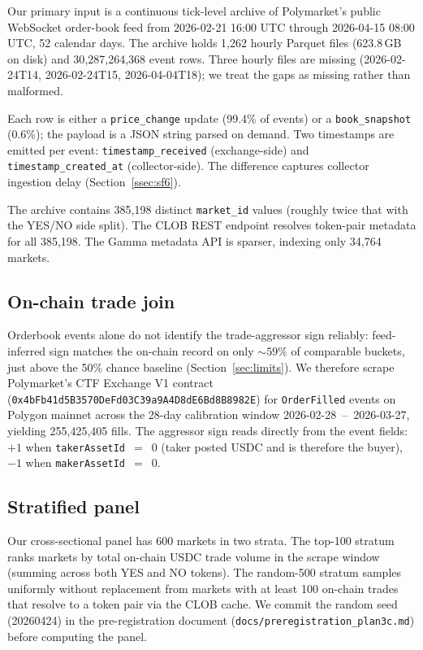 \documentclass[11pt,a4paper,twocolumn]{article}
\begin{document}
Our primary input is a continuous tick-level archive of Polymarket's
public WebSocket order-book feed from 2026-02-21 16:00 UTC through
2026-04-15 08:00 UTC, 52 calendar days. The archive holds 1{,}262
hourly Parquet files (623.8\,GB on disk) and 30{,}287{,}264{,}368
event rows. Three hourly files are missing
(2026-02-24T14, 2026-02-24T15, 2026-04-04T18); we treat the gaps as
missing rather than malformed.

Each row is either a \texttt{price\_change} update (99.4\% of events)
or a \texttt{book\_snapshot} (0.6\%); the payload is a JSON string
parsed on demand. Two timestamps are emitted per event:
\texttt{timestamp\_received} (exchange-side) and
\texttt{timestamp\_created\_at} (collector-side). The difference
captures collector ingestion delay (Section~\ref{ssec:sf6}).

The archive contains 385{,}198 distinct \texttt{market\_id} values
(roughly twice that with the YES/NO side split). The CLOB REST
endpoint resolves token-pair metadata for all 385{,}198. The Gamma
metadata API is sparser, indexing only 34{,}764 markets.

\subsection{On-chain trade join}
\label{ssec:onchain-join}

Orderbook events alone do not identify the trade-aggressor sign
reliably: feed-inferred sign matches the on-chain record on only
$\sim 59\%$ of comparable buckets, just above the 50\% chance
baseline (Section~\ref{sec:limits}). We therefore scrape Polymarket's
CTF Exchange V1 contract
(\texttt{0x4bFb41d5\allowbreak B3570DeFd03\allowbreak C39a9A4D8dE6Bd8\allowbreak B8982E})
for \texttt{OrderFilled} events on Polygon mainnet across the 28-day
calibration window 2026-02-28~--~2026-03-27, yielding 255{,}425{,}405
fills. The aggressor sign reads directly from the event fields: $+1$
when \texttt{takerAssetId}~$=$~0 (taker posted USDC and is therefore
the buyer), $-1$ when \texttt{makerAssetId}~$=$~0.

\subsection{Stratified panel}
\label{ssec:panel}

Our cross-sectional panel has 600 markets in two strata. The top-100
stratum ranks markets by total on-chain USDC trade volume in the
scrape window (summing across both YES and NO tokens). The random-500
stratum samples uniformly without replacement from markets with at
least 100 on-chain trades that resolve to a token pair via the CLOB
cache. We commit the random seed (20260424) in the pre-registration
document (\texttt{docs/preregistration\_plan3c.md}) before computing
the panel.
\end{document}
